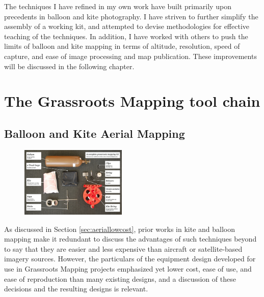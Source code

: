 \documentclass[11pt,oneside,notitlepage]{report}
\begin{document}
The techniques I have refined in my own work have built primarily upon precedents in balloon and kite photography. I have striven to further simplify the assembly of a working kit, and attempted to devise methodologies for effective teaching of the techniques. In addition, I have worked with others to push the limits of balloon and kite mapping in terms of altitude, resolution, speed of capture, and ease of image processing and map publication. These improvements will be discussed in the following chapter.

\chapter{The Grassroots Mapping tool chain}
\label{chap:toolchain}

\section{Balloon and Kite Aerial Mapping}

\begin{figure}
	\begin{flushright}
		\includegraphics[width=0.45\textwidth]{images/100-dollar-satellite-poster.jpg}
	\end{flushright}
\end{figure}

As discussed in Section \ref{sec:aeriallowcost}, prior works in kite and balloon mapping make it redundant to discuss the advantages of such techniques beyond to say that they are easier and less expensive than aircraft or satellite-based imagery sources. However, the particulars of the equipment design developed for use in Grassroots Mapping projects emphasized yet lower cost, ease of use, and ease of reproduction than many existing designs, and a discussion of these decisions and the resulting designs is relevant. 
\end{document}

